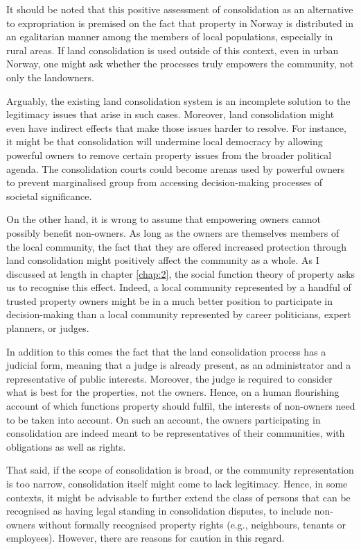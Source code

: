 It should be noted that this positive assessment of consolidation as an alternative to expropriation is  premised on the fact that property in Norway is distributed in an egalitarian manner among the members of local populations, especially in rural areas. If land consolidation is used outside of this context, even in urban Norway, one might ask whether the processes truly empowers the community, not only the landowners.

Arguably, the existing land consolidation system is an incomplete solution to the legitimacy issues that arise in such cases. Moreover, land consolidation might even have indirect effects that make those issues harder to resolve. For instance, it might be that consolidation will undermine local democracy by allowing powerful owners to remove certain property issues from the broader political agenda. The consolidation courts could become arenas used by powerful owners to prevent marginalised group from accessing decision-making processes of societal significance.

On the other hand, it is wrong to assume that empowering owners cannot possibly benefit non-owners. As long as the owners are themselves members of the local community, the fact that they are offered increased protection through land consolidation might positively affect the community as a whole. As I discussed at length in chapter \ref{chap:2}, the social function theory of property asks us to recognise this effect. Indeed, a local community represented by a handful of trusted property owners might be in a much better position to participate in decision-making than a local community represented by career politicians, expert planners, or judges.

In addition to this comes the fact that the land consolidation process has a judicial form, meaning that a judge is already present, as an administrator and a representative of public interests. Moreover, the judge is required to consider what is best for the properties, not the owners. Hence, on a human flourishing account of which functions property should fulfil, the interests of non-owners need to be taken into account. On such an account, the owners participating in consolidation are indeed meant to be representatives of their communities, with obligations as well as rights.

That said, if the scope of consolidation is broad, or the community representation is too narrow, consolidation itself might come to lack legitimacy. Hence, in some contexts, it might be advisable to further extend the class of persons that can be recognised as having legal standing in consolidation disputes, to include non-owners without formally recognised property rights (e.g., neighbours, tenants or employees). However, there are reasons for caution in this regard. 

